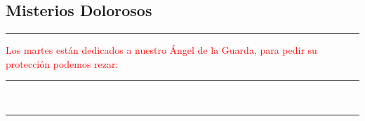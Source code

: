\documentclass[10pt,twoside]{book}
\begin{document}
\noindent\subsection*{Misterios Dolorosos}



\vspace{0.5em}



\vspace{1.5em}





\vspace{1.5em}





\vspace{1.5em}





\vspace{1.5em}



{}

\iralfinal

\begin{center}
      {\rule{10em}{0.4pt}}

      \vspace{0.75em}

      \textcolor{red}{Los martes están dedicados a nuestro Ángel de la Guarda, para pedir su protección podemos rezar:}
\end{center}

\begin{multicols}{2}

      

\end{multicols}

\begin{center}
      \begin{spacing}{0.25}
            {\rule{20em}{0.4pt}}\\
            {\rule{20em}{0.4pt}}
      \end{spacing}
\end{center}
\end{document}
